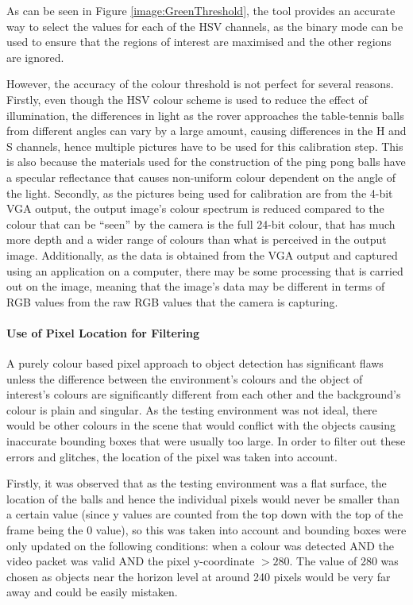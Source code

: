 \documentclass[a4paper]{article}
\begin{document}
As can be seen in Figure \ref{image:GreenThreshold}, the tool provides an accurate way to select the values 
for each of the HSV channels, as the binary mode can be used to ensure that the regions
of interest are maximised and the other regions are ignored. 

However, the accuracy of the colour threshold is not perfect for several reasons.
Firstly, even though the HSV colour scheme is used to reduce the effect of illumination, 
the differences in light as the rover approaches the table-tennis balls from different angles
can vary by a large amount, causing differences in the H and S channels, 
hence multiple pictures have to be used for this calibration step. This is also
because the materials used for the construction of the ping pong balls have a specular 
reflectance that causes non-uniform colour dependent on the angle of the light. 
Secondly, as the pictures being used for calibration are from the 4-bit VGA output, 
the output image's colour spectrum is reduced compared to the colour that can be
 ``seen'' by the camera is the full 24-bit colour, that has much more depth and 
a wider range of colours than what is perceived in the output image. Additionally, 
as the data is obtained from the VGA output and captured using an application on 
a computer, there may be some processing that is carried out on the image, meaning 
that the image's data may be different in terms of RGB values from the raw RGB values
that the camera is capturing.

\paragraph*{Use of Pixel Location for Filtering}

A purely colour based pixel approach to object detection has significant flaws unless
the difference between the environment's colours and the object of interest's colours 
are significantly different from each other and the background's colour is plain and
singular. As the testing environment was not ideal, there would be other colours
in the scene that would conflict with the objects causing inaccurate bounding boxes that
were usually too large. In order to filter out these errors and glitches, the 
location of the pixel was taken into account.

Firstly, it was observed that as the testing environment was a flat surface, the 
location of the balls and hence the individual pixels would never be smaller than 
a certain value (since y values are counted from the top down with the top of 
the frame being the 0 value), so this was taken into account and bounding boxes
were only updated on the following conditions: when a colour was detected AND the
video packet was valid AND the pixel y-coordinate \(> 280\). The value of 280 was 
chosen as objects near the horizon level at around 240 pixels would be very far 
away and could be easily mistaken.
\end{document}
